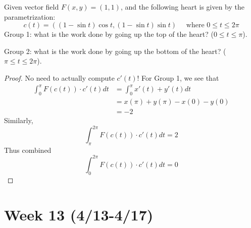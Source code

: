 \documentclass[openany]{book}
\begin{document}
\begin{prob}
    Given vector field $F(x,y)=(1,1)$, and the following heart is given by the parametrization:
    \begin{equation*}
        c(t)=((1-\sin t)\cos t, (1-\sin t)\sin t) \quad \text{ where } 0\leq t\leq 2\pi
    \end{equation*}
    Group 1: what is the work done by going up the top of the heart? ($0\leq t\leq \pi$).
    
    \noindent
    Group 2: what is the work done by going up the bottom of the heart? ($\pi\leq t\leq 2\pi$).
    \begin{center}
    \end{center}
\end{prob}
\begin{proof}
    No need to actually compute $c'(t)$! For Group 1, we see that 
    \begin{align*}
        \int_0^\pi F(c(t))\cdot c'(t)dt&=\int_0^\pi x'(t)+y'(t)dt \tag{$c(t)=(x(t),y(t))$}\\
        &=x(\pi)+y(\pi)-x(0)-y(0)\\
        &=-2
    \end{align*}
    Similarly, 
    \begin{equation*}
        \int_{\pi}^{2\pi}F(c(t))\cdot c'(t)dt=2
    \end{equation*}
    Thus combined 
    \begin{equation*}
        \int_0^{2\pi}F(c(t))\cdot c'(t)dt=0
    \end{equation*}
\end{proof}



\newpage
\section*{\centering Week 13 (4/13-4/17)}
\end{document}
